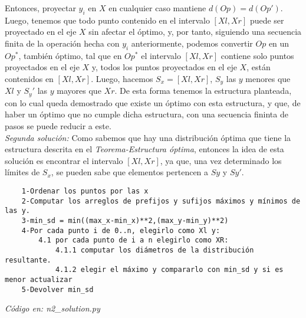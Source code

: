 \documentclass{article}
\begin{document}
Entonces, proyectar $y_i$ en $X$ en cualquier caso mantiene $d(Op)=d(Op')$. Luego, tenemos que todo punto contenido en el intervalo $[Xl,Xr]$ puede ser proyectado en el eje $X$ sin afectar el \'optimo, y, por tanto, siguiendo una secuencia finita de la operaci\'on hecha con $y_i$ anteriormente, podemos convertir $Op$ en un $Op^*$, tambi\'en \'optimo, tal que en $Op^*$ el intervalo $[Xl,Xr]$ contiene solo puntos proyectados en el eje $X$ y, todos los puntos proyectados en el eje $X$, est\'an contenidos en $[Xl,Xr]$. Luego, hacemos $S_x=[Xl,Xr]$, $S_y$ las $y$ menores que $Xl$ y $S_y'$ las $y$ mayores que $Xr$. De esta forma tenemos la estructura planteada, con lo cual queda demostrado que existe un \'optimo con esta estructura, y que, de haber un \'optimo que no cumple dicha estructura, con una secuencia fininta de pasos se puede reducir a este.\\


\textit{Segunda soluci\'on:} Como sabemos que hay una distribuci\'on \'optima que tiene la estructura descrita en el \textit{Teorema-Estructura \'optima}, entonces la idea de esta soluci\'on es encontrar el intervalo $[Xl,Xr]$, ya que, una vez determinado los l\'imites de $S_x$, se pueden sabe que elementos pertencen a $Sy$ y $Sy'$.\\

\begin{verbatim}
    1-Ordenar los puntos por las x
    2-Computar los arreglos de prefijos y sufijos máximos y mínimos de las y.
    3-min_sd = min((max_x-min_x)**2,(max_y-min_y)**2)
    4-Por cada punto i de 0..n, elegirlo como Xl y:
        4.1 por cada punto de i a n elegirlo como XR:
            4.1.1 computar los diámetros de la distribución resultante.
            4.1.2 elegir el máximo y compararlo con min_sd y si es menor actualizar
    5-Devolver min_sd
\end{verbatim}
\textit{C\'odigo en: n2\_solution.py}\\
\end{document}
